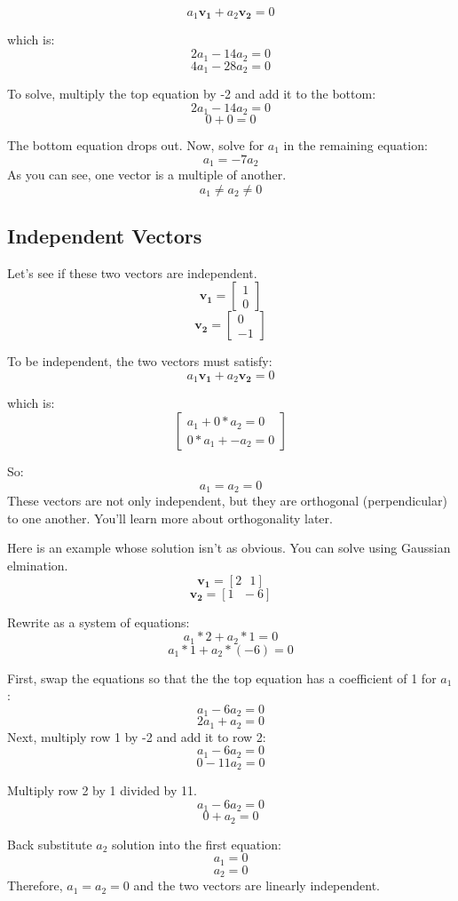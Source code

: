 	$$a_1 \mathbf{v_1} + a_2 \mathbf{v_2} = 0$$

which is:
	$$2a_1 -14a_2 = 0$$
	$$4a_1 -28a_2 = 0$$

To solve, multiply the top equation by -2 and add it to the bottom: 
$$2a_1 - 14a_2 = 0 $$
$$ 0  + 0     = 0 $$

The bottom equation drops out. Now,  solve for $a_1$ in the remaining equation:
$$a_1 = -7a_2$$
As you can see, one vector is a multiple of another. $$a_1 \neq a_2 \neq 0$$

\subsection{Independent Vectors}
Let's see if these two vectors are independent.
$$\mathbf{v_1} = \begin{bmatrix}
1 \\
0
\end{bmatrix}$$
$$\mathbf{v_2} = \begin{bmatrix}
0 \\
-1
\end{bmatrix}$$

To be independent, the two vectors must satisfy:
	$$a_1 \mathbf{v_1} + a_2 \mathbf{v_2} = 0$$
	
which is:
$$\begin{bmatrix}
	a_1 + 0*a_2 = 0 \\
	0*a_1 + -a_2 = 0
\end{bmatrix}$$

So:
$$a_1 = a_2 = 0$$
These vectors are not only independent, but they are orthogonal (perpendicular)
to one another. You'll learn more about orthogonality later.

Here is an example whose solution isn't as obvious. You can solve using 
Gaussian elmination.
$$\mathbf{v_1} = [2\text{ } 1]$$
$$\mathbf{v_2} = [1 \text{ }-6]$$

Rewrite as a system of equations:
$$a_1*2 + a_2*1 = 0 $$
$$a_1*1 + a_2*(-6) = 0$$

First, swap the equations so that the the top equation has a coefficient of 1 
for $a_1$:
$$a_1 - 6a_2 = 0$$ 
$$2a_1 + a_2 = 0$$ 
Next, multiply row 1 by -2 and add it to row 2:
$$a_1 - 6a_2 = 0$$ 
$$0  - 11a_2 = 0$$ 

Multiply row 2 by 1 divided by 11.
$$a_1 - 6a_2 = 0$$ 
$$0 + a_2 = 0$$ 

Back substitute $a_2$ solution into the first equation:
$$a_1  = 0$$
$$a_2 = 0$$ 
Therefore, $a_1 = a_2 = 0$ and the two vectors are linearly independent.

